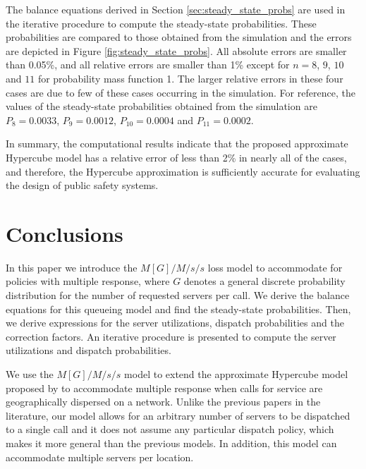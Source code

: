 \documentclass[11pt]{article}\topmargin 0mm
\begin{document}
The balance equations derived in Section
\ref{sec:steady_state_probs} are used in the iterative
procedure to compute the steady-state probabilities. These
probabilities are compared to those obtained from the
simulation and the errors are depicted in Figure
\ref{fig:steady_state_probs}. All absolute errors are smaller
than 0.05\%, and all relative errors are smaller than 1\%
except for $n=8$, $9$, $10$ and $11$ for probability mass
function 1. The larger relative errors in these four cases are
due to few of these cases occurring in the simulation. For
reference, the values of the steady-state probabilities
obtained from the simulation are $P_8=0.0033$, $P_9=0.0012$,
$P_{10}=0.0004$ and $P_{11}=0.0002$. %

In summary, the computational results indicate that the
proposed approximate Hypercube model has a relative error of less
than 2\% in nearly all of the cases, and therefore, the
Hypercube approximation is sufficiently accurate for evaluating
the design of public safety systems.



\section{Conclusions}
\label{sec:discussions}

In this paper we introduce the $M[G]/M/s/s$ loss model to
accommodate for policies with multiple response, where $G$
denotes a general discrete probability distribution for the
number of requested servers per call. We derive the balance
equations for this queueing model and find the steady-state
probabilities. Then, we derive expressions for the server
utilizations, dispatch probabilities and the correction
factors. An iterative procedure is presented to compute the
server utilizations and dispatch probabilities.

We use the $M[G]/M/s/s$ model to extend the approximate
Hypercube model proposed by \citet{Budge-etal-09} to
accommodate multiple response when calls for service are
geographically dispersed on a network. Unlike the previous
papers in the literature, our model allows for an arbitrary
number of servers to be dispatched to a single call and it does
not assume any particular dispatch policy, which makes it more
general than the previous models. In addition, this model can
accommodate multiple servers per location.
\end{document}
